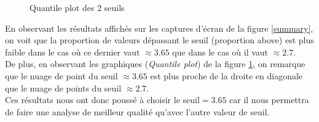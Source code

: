 \documentclass[a4paper,french,10pt]{article}
\begin{document}
\begin{figure}[htp] 
	\centering
	\hfill%
	\caption{Quantile plot des 2 seuils}
	\label{graph}
\end{figure}

En observant les résultats affichés sur les captures d'écran de la figure \ref{summary}, on voit que la proportion de valeurs dépassant le seuil (proportion above) est plus faible dans le cas où ce dernier vaut $\approx 3.65$ que dans le cas où il vaut $\approx 2.7$. \\
De plus, en observant les graphiques (\textit{Quantile plot}) de la figure \ref{graph}, on remarque que le nuage de point du seuil $\approx 3.65$ est plus proche de la droite en diagonale que le nuage de points du seuil $\approx 2.7$. \\
Ces résultats nous ont donc poussé à choisir le seuil$=3.65$ car il nous permettra de faire une analyse de meilleur qualité qu'avec l'autre valeur de seuil.
\end{document}
